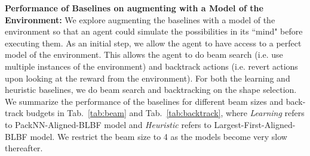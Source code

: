 \documentclass{article}
\begin{document}
\noindent\textbf{Performance of Baselines on augmenting with a Model of the Environment:} We explore augmenting the baselines with a model of the environment so that an agent could simulate the possibilities in its ``mind" before executing them. As an initial step, we allow the agent to have access to a perfect model of the environment.  This allows the agent to do beam search (i.e. use multiple instances of the environment) and backtrack actions (i.e. revert actions upon looking at the reward from the environment). For both the learning and heuristic baselines, we do beam search and backtracking on the shape selection. We summarize the performance of the baselines for different beam sizes and back-track budgets in Tab.~\ref{tab:beam} and Tab.~\ref{tab:backtrack}, where \textit{Learning} refers to PackNN-Aligned-BLBF model and \textit{Heuristic} refers to Largest-First-Aligned-BLBF model. We restrict the beam size to 4 as the models become very slow thereafter. 
\end{document}
